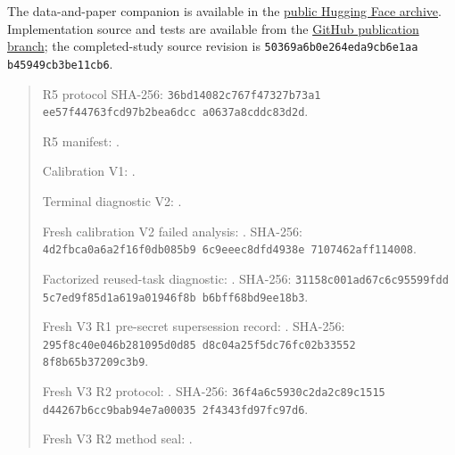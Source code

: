 \documentclass[twoside,11pt]{article}
\begin{document}
The data-and-paper companion is available in the
\href{https://huggingface.co/datasets/hackerprofile1/modelsmc-pbe-research}{public Hugging Face archive}.
Implementation source and tests are available from the
\href{https://github.com/quangng2000/modelsmc-reading-notes/tree/python-modelsmc-pbe}{GitHub publication branch};
the completed-study source revision is
\texttt{50369a6b\allowbreak 0e264eda\allowbreak 9cb6e1aa\allowbreak
b45949cb\allowbreak 3be11cb6}.
\begin{quote}
\small\raggedright
R5 protocol SHA-256:
\texttt{36bd1408\allowbreak 2c767f47\allowbreak 327b73a1\allowbreak
ee57f447\allowbreak 63fcd97b\allowbreak 2bea6dcc\allowbreak
a0637a8c\allowbreak ddc83d2d}.\par
R5 manifest:
.\par
Calibration V1:
.\par
Terminal diagnostic V2:
.\par
Fresh calibration V2 failed analysis:
.
SHA-256:
\texttt{4d2fbca0\allowbreak a6a2f16f\allowbreak 0db085b9\allowbreak
6c9eeec8\allowbreak dfd4938e\allowbreak
7107462a\allowbreak ff114008}.\par
Factorized reused-task diagnostic:
.
SHA-256:
\texttt{31158c00\allowbreak 1ad67c6c\allowbreak 95599fdd\allowbreak
5c7ed9f8\allowbreak 5d1a619a\allowbreak 01946f8b\allowbreak
b6bff68b\allowbreak d9ee18b3}.\par
Fresh V3 R1 pre-secret supersession record:
.
SHA-256:
\texttt{295f8c40\allowbreak e046b281\allowbreak 095d0d85\allowbreak
d8c04a25\allowbreak f5dc76fc\allowbreak 02b33552\allowbreak
8f8b65b3\allowbreak 7209c3b9}.\par
Fresh V3 R2 protocol:
.
SHA-256:
\texttt{36f4a6c5\allowbreak 930c2da2\allowbreak c89c1515\allowbreak
d44267b6\allowbreak cc9bab94\allowbreak e7a00035\allowbreak
2f4343fd\allowbreak 97fc97d6}.\par
Fresh V3 R2 method seal:
.

\end{quote}
\end{document}
